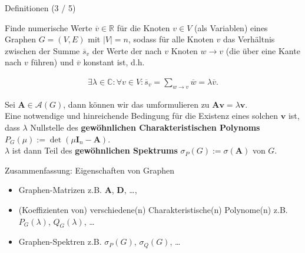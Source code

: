 \documentclass[aspectratio=169]{beamer}
\begin{document}
\begin{frame}{Definitionen (3 / 5)}
    
    \begin{definition*}
        
        Finde numerische Werte $\overline v \in \mathbb R$ für die Knoten $v \in V$ (als Variablen) eines Graphen $G = (V, E)$ mit $|V| = n$, sodass für alle Knoten $v$ das Verhältnis zwischen der Summe $\overline s_v$ der Werte der nach $v$ Knoten $w \to v$ (die über eine Kante nach $v$ führen) und $\overline v$ konstant ist, d.h.
    
        \begin{align*}
            \exists \lambda \in \mathbb C:
                \forall v \in V:
                    \overline s_v = \sum_{w \to v} \overline w = \lambda \overline v.
        \end{align*}
    
        Sei $\mathbf A \in \mathcal A(G)$, dann können wir das umformulieren zu $\mathbf A \mathbf v = \lambda \mathbf v$. \\
        Eine notwendige und hinreichende Bedingung für die Existenz eines solchen $\mathbf v$ ist, dass $\lambda$ Nullstelle des \textbf{gewöhnlichen Charakteristischen Polynoms} $P_G(\mu) := \det(\mu \mathbf I_n - \mathbf A)$. \\
        $\lambda$ ist dann Teil des \textbf{gewöhnlichen Spektrums} $\sigma_P(G) := \sigma(\mathbf A)$ von $G$.

    \end{definition*}

\end{frame}

\begin{frame}{Zusammenfassung:  Eigenschaften von Graphen}

    \begin{block}{}

        \begin{itemize}
            \item Graphen-Matrizen z.B. $\mathbf A$, $\mathbf D$, \dots,
            \item (Koeffizienten von) verschiedene(n) Charakteristische(n) Polynome(n) z.B. $P_G(\lambda)$, $Q_G(\lambda)$, \dots
            \item Graphen-Spektren z.B. $\sigma_P(G)$, $\sigma_Q(G)$, \dots
        \end{itemize}

    \end{block}

\end{frame}
\end{document}
